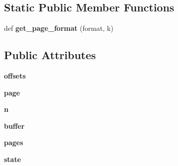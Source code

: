 \subsection*{Static Public Member Functions}
\begin{DoxyCompactItemize}
\item 
def {\bfseries get\+\_\+page\+\_\+format} (format, k)\hypertarget{class_libraries_1_1fpdf_1_1fpdf_1_1_f_p_d_f_a1b1a5eea58eda545301a4a40f1694bbb}{}\label{class_libraries_1_1fpdf_1_1fpdf_1_1_f_p_d_f_a1b1a5eea58eda545301a4a40f1694bbb}

\end{DoxyCompactItemize}
\subsection*{Public Attributes}
\begin{DoxyCompactItemize}
\item 
{\bfseries offsets}\hypertarget{class_libraries_1_1fpdf_1_1fpdf_1_1_f_p_d_f_a80491c4633c4f84b1277e3961b388e1b}{}\label{class_libraries_1_1fpdf_1_1fpdf_1_1_f_p_d_f_a80491c4633c4f84b1277e3961b388e1b}

\item 
{\bfseries page}\hypertarget{class_libraries_1_1fpdf_1_1fpdf_1_1_f_p_d_f_a8b2660bc022e72cf70a1a2cb92c2e690}{}\label{class_libraries_1_1fpdf_1_1fpdf_1_1_f_p_d_f_a8b2660bc022e72cf70a1a2cb92c2e690}

\item 
{\bfseries n}\hypertarget{class_libraries_1_1fpdf_1_1fpdf_1_1_f_p_d_f_a07a9b71312dc1257a2ea8444b64f697b}{}\label{class_libraries_1_1fpdf_1_1fpdf_1_1_f_p_d_f_a07a9b71312dc1257a2ea8444b64f697b}

\item 
{\bfseries buffer}\hypertarget{class_libraries_1_1fpdf_1_1fpdf_1_1_f_p_d_f_ab3e898bc375535bb0c62b7e0086a351b}{}\label{class_libraries_1_1fpdf_1_1fpdf_1_1_f_p_d_f_ab3e898bc375535bb0c62b7e0086a351b}

\item 
{\bfseries pages}\hypertarget{class_libraries_1_1fpdf_1_1fpdf_1_1_f_p_d_f_a235ae099fd2358ef1dda26013ad0035f}{}\label{class_libraries_1_1fpdf_1_1fpdf_1_1_f_p_d_f_a235ae099fd2358ef1dda26013ad0035f}

\item 
{\bfseries state}\hypertarget{class_libraries_1_1fpdf_1_1fpdf_1_1_f_p_d_f_ab4fc25c1a315f313e37144acdff8c5bf}{}\label{class_libraries_1_1fpdf_1_1fpdf_1_1_f_p_d_f_ab4fc25c1a315f313e37144acdff8c5bf}


\end{DoxyCompactItemize}

